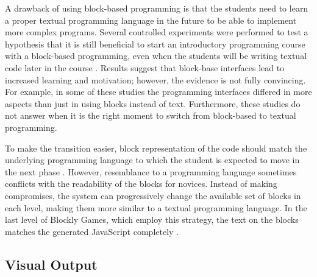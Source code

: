 A drawback of using block-based programming
  is that the students need to learn a proper textual programming language in
  the future to be able to implement more complex programs.
Several controlled experiments were performed to test a hypothesis
  that it is still beneficial to start an introductory programming course
  with a block-based programming,
  even when the students will be writing textual code later in the course
  \cite{comparing-blocks-text-price2015, comparing-blocks-text-weintrop2017}.
Results suggest that block-base interfaces lead to increased learning and
motivation; however, the evidence is not fully convincing. For example, in
some of these studies the programming interfaces differed in more aspects than
just in using blocks instead of text. Furthermore, these studies do not
answer when it is the right moment to switch from block-based to textual
programming.

To make the transition easier, block representation of the code
  should match the underlying programming language
  to which the student is expected to move in the next phase
  \cite{challenges-of-blocks-based-environments}.
However, resemblance to a programming language sometimes
  conflicts with the readability of the blocks for novices.
Instead of making compromises,
  the system can progressively change the available set of blocks in each level,
  making them more similar to a textual programming language.
In the last level of Blockly Games, which employ this strategy,
  the text on the blocks matches the generated JavaScript completely
  \cite{blockly-10-things}.



\subsection{Visual Output}
\label{sec:visual-output}

